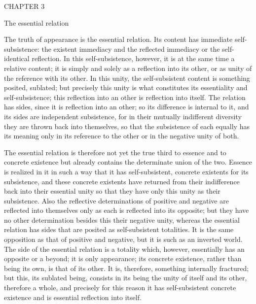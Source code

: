 CHAPTER 3

The essential relation

The truth of appearance is the essential relation.
Its content has immediate self-subsistence:
the existent immediacy and the reflected immediacy
or the self-identical reflection.
In this self-subsistence, however,
it is at the same time a relative content;
it is simply and solely as a reflection into its other,
or as unity of the reference with its other.
In this unity, the self-subsistent content is
something posited, sublated;
but precisely this unity is what constitutes
its essentiality and self-subsistence;
this reflection into an other is reflection into itself.
The relation has sides, since it is reflection into an other;
so its difference is internal to it,
and its sides are independent subsistence,
for in their mutually indifferent diversity
they are thrown back into themselves,
so that the subsistence of each equally has its meaning
only in its reference to the other
or in the negative unity of both.

The essential relation is therefore not yet
the true third to essence and to concrete existence
but already contains the determinate union of the two.
Essence is realized in it in such a way that
it has self-subsistent, concrete existents for its subsistence,
and these concrete existents have returned
from their indifference back into their essential unity
so that they have only this unity as their subsistence.
Also the reflective determinations
of positive and negative are
reflected into themselves only as
each is reflected into its opposite;
but they have no other determination
besides this their negative unity,
whereas the essential relation has sides
that are posited as self-subsistent totalities.
It is the same opposition as that of positive and negative,
but it is such as an inverted world.
The side of the essential relation is a totality
which, however, essentially has an opposite or a beyond;
it is only appearance;
its concrete existence,
rather than being its own,
is that of its other.
It is, therefore, something internally fractured;
but this, its sublated being, consists in
its being the unity of itself and its other,
therefore a whole, and precisely for this reason
it has self-subsistent concrete existence
and is essential reflection into itself.

